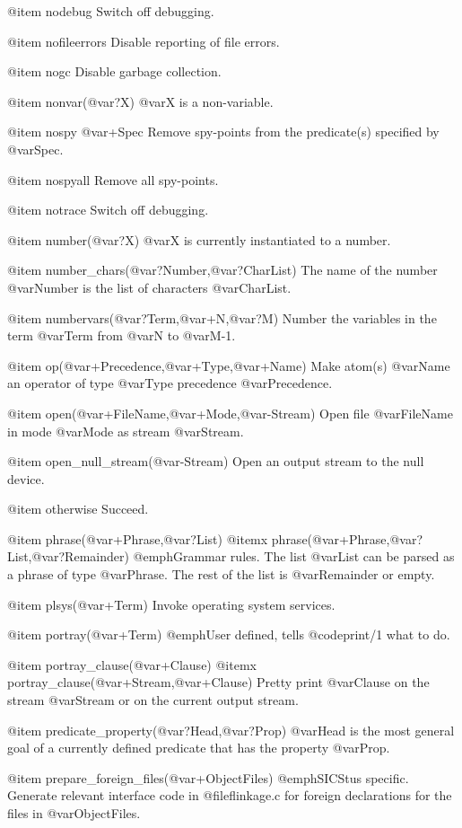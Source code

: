 {{{{{@item nodebug
Switch off debugging.

@item nofileerrors
Disable reporting of file errors.

@item nogc
Disable garbage collection.

@item nonvar(@var{?X})
@var{X} is a non-variable.

@item nospy @var{+Spec}
Remove spy-points from the predicate(s) specified by @var{Spec}.

@item nospyall
Remove all spy-points.

@item notrace
Switch off debugging.

@item number(@var{?X})
@var{X} is currently instantiated to a number.

@item number_chars(@var{?Number},@var{?CharList})
The name of the number @var{Number} is the list of characters @var{CharList}.

@item numbervars(@var{?Term},@var{+N},@var{?M})
Number the variables in the term @var{Term} from @var{N} to @var{M}-1.

@item op(@var{+Precedence},@var{+Type},@var{+Name})
Make atom(s) @var{Name} an operator of type @var{Type} precedence
@var{Precedence}.

@item open(@var{+FileName},@var{+Mode},@var{-Stream})
Open file @var{FileName} in mode @var{Mode} as stream @var{Stream}.

@item open_null_stream(@var{-Stream})
Open an output stream to the null device.

@item otherwise
Succeed.

@item phrase(@var{+Phrase},@var{?List})
@itemx phrase(@var{+Phrase},@var{?List},@var{?Remainder})
@emph{Grammar rules.} The list @var{List} can be parsed as a phrase of type
@var{Phrase}.  The rest of the list is @var{Remainder} or empty.

@item plsys(@var{+Term})
Invoke operating system services.

@item portray(@var{+Term})
@emph{User defined}, tells @code{print/1} what to do.

@item portray_clause(@var{+Clause})
@itemx portray_clause(@var{+Stream},@var{+Clause})
Pretty print @var{Clause} on the stream @var{Stream} or 
on the current output stream.

@item predicate_property(@var{?Head},@var{?Prop})
@var{Head} is the most general goal of a currently defined predicate that
has the property @var{Prop}.

@item prepare_foreign_files(@var{+ObjectFiles})
@emph{SICStus specific.} Generate relevant interface code in
@file{flinkage.c} for foreign declarations for the files in
@var{ObjectFiles}.

}}}}}
